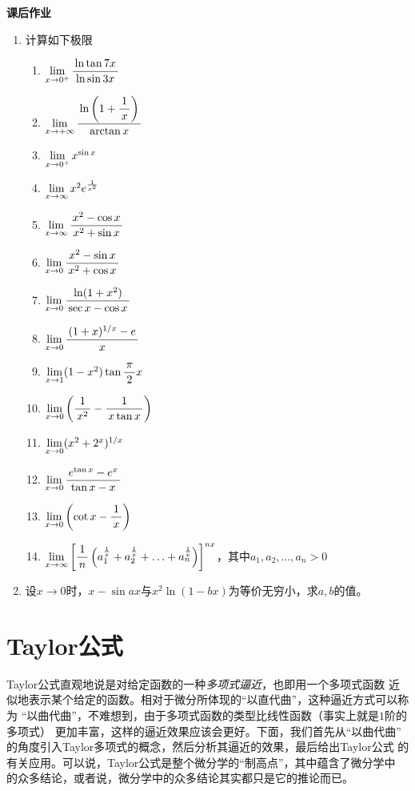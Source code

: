 \begin{ext}
	{\bf 课后作业}
	
	\begin{enumerate}
	  \item 计算如下极限
		\begin{enumerate}[(1)]
		  \item $\lim\limits_{x\to{0^+}}\displaystyle\frac{\,{\ln\tan 7x}\,}{\,{\ln\sin 3x}\,}$
		  \item $\lim\limits_{x\to{+\infty}}\displaystyle\frac{\,{\ln\left(1+\displaystyle\frac{\,{1}\,}{\,{x}\,}\right)}\,}{\,{\arctan x}\,}$
		  \item $\lim\limits_{x\to{0^+}}x^{\sin x}$
		  \item $\lim\limits_{x\to{\infty}}x^2e^{\frac1{x^2}}$
		  \item $\lim\limits_{x\to{\infty}}\displaystyle\frac{\,{x^2-\cos x}\,}{\,{x^2+\sin x}\,}$
		  \item $\lim\limits_{x\to{0}}\displaystyle\frac{\,{x^2-\sin x}\,}{\,{x^2+\cos x}\,}$
		  \item $\lim\limits_{x\to{0}}\displaystyle\frac{\,{\ln(1+x^2)}\,}{\,{\sec x-\cos x}\,}$
  		  \item $\lim\limits_{x\to{0}}\displaystyle\frac{\,{(1+x)^{1/x}-e}\,}{\,{x}\,}$ 
   		  \item $\lim\limits_{x\to{1}}(1-x^2)\tan\displaystyle\frac{\,{\pi}\,}{\,{2}\,}x$ 
  		  \item $\lim\limits_{x\to{0}}\left(\displaystyle\frac{\,{1}\,}{\,{x^2}\,}-\displaystyle\frac{\,{1}\,}{\,{x\tan x}\,}\right)$ 
  		  \item $\lim\limits_{x\to{0}}(x^2+2^x)^{1/x}$ 
  		  \item $\lim\limits_{x\to{0}}\displaystyle\frac{\,{e^{\tan x}-e^x}\,}{\,{\tan x-x}\,}$
  		  \item $\lim\limits_{x\to{0}}\left(\cot x-\displaystyle\frac{\,{1}\,}{\,{x}\,}\right)$ 
  		  \item $\lim\limits_{x\to{\infty}}\left[\displaystyle\frac{\,{1}\,}{\,{n}\,}\left(a_1^{\frac1x}+a_2^{\frac1x}
  		  +\ldots+a_n^{\frac1x}\right)\right]^{nx}$，其中$a_1,a_2,\ldots,a_n>0$
		\end{enumerate}
	  \item 设$x\to 0$时，$x-\sin ax$与$x^2\ln(1-bx)$为等价无穷小，求$a,b$的值。
	\end{enumerate}
\end{ext}

\section{Taylor公式}

Taylor公式直观地说是对给定函数的一种{\it 多项式逼近}，也即用一个多项式函数
近似地表示某个给定的函数。相对于微分所体现的“以直代曲”，这种逼近方式可以称为
“以曲代曲”，不难想到，由于多项式函数的类型比线性函数（事实上就是$1$阶的多项式）
更加丰富，这样的逼近效果应该会更好。下面，我们首先从“以曲代曲”
的角度引入Taylor多项式的概念，然后分析其逼近的效果，最后给出Taylor公式
的有关应用。可以说，Taylor公式是整个微分学的“制高点”，其中蕴含了微分学中
的众多结论，或者说，微分学中的众多结论其实都只是它的推论而已。

